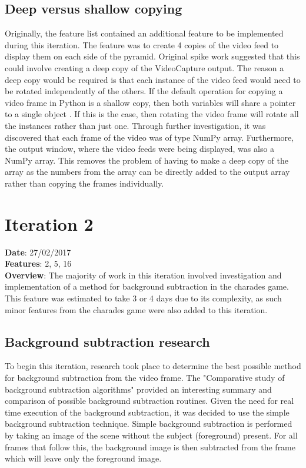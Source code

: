 \subsection{Deep versus shallow copying}
Originally, the feature list contained an additional feature to be implemented during this iteration. The feature was to create 4 copies of the video feed to display them on each side of the pyramid. Original spike work suggested that this could involve creating a deep copy of the VideoCapture output. The reason a deep copy would be required is that each instance of the video feed would need to be rotated independently of the others. If the default operation for copying a video frame in Python is a shallow copy, then both variables will share a pointer to a single object \cite{deep_shallow_copying}. If this is the case, then rotating the video frame will rotate all the instances rather than just one. Through further investigation, it was discovered that each frame of the video was of type NumPy array. Furthermore, the output window, where the video feeds were being displayed, was also a NumPy array. This removes the problem of having to make a deep copy of the array as the numbers from the array can be directly added to the output array rather than copying the frames individually.

\newpage

\section{Iteration 2}
\textbf{Date}: 27/02/2017 \\
\textbf{Features}: 2, 5, 16 \\
\textbf{Overview}: The majority of work in this iteration involved investigation and implementation of a method for background subtraction in the charades game. This feature was estimated to take 3 or 4 days due to its complexity, as such minor features from the charades game were also added to this iteration.

\subsection{Background subtraction research}
To begin this iteration, research took place to determine the best possible method for background subtraction from the video frame. The "Comparative study of background subtraction algorithms" \cite{background_subtraction_comparison} provided an interesting summary and comparison of possible background subtraction routines. Given the need for real time execution of the background subtraction, it was decided to use the simple background subtraction technique. Simple background subtraction is performed by taking an image of the scene without the subject (foreground) present. For all frames that follow this, the background image is then subtracted from the frame which will leave only the foreground image.

